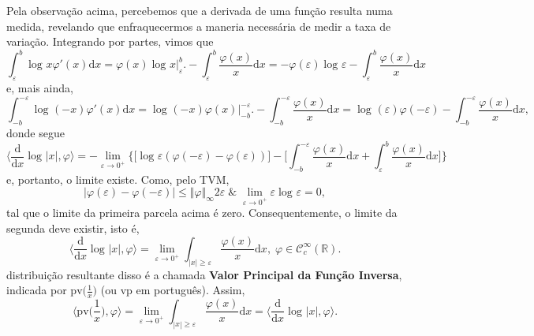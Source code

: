 \documentclass[../distribution_theory_notes.tex]{subfiles}
\begin{document}
               Pela observação acima, percebemos que a derivada de uma função resulta numa medida, revelando que enfraquecermos a maneria necessária de medir a taxa de variação. Integrando por partes, vimos que 
                 \[
                   \int_{\varepsilon }^{b}\log^{}{x}\varphi '(x) \mathrm{d}x = \varphi (x)\log^{}{x}\biggl|_{\varepsilon }^{b}\biggr. - \int_{\varepsilon }^{b}\frac{\varphi (x) }{x} \mathrm{d}x = -\varphi (\varepsilon )\log^{}{\varepsilon }- \int_{\varepsilon }^{b}\frac{\varphi (x)}{x} \mathrm{d}x
                 \]
                 e, mais ainda, 
                   \[
                     \int_{-b}^{-\varepsilon }\log^{}{(-x)}\varphi'(x) \mathrm{d}x = \log^{}{(-x)}\varphi (x)\biggl|_{-b}^{-\varepsilon }\biggr. - \int_{-b}^{-\varepsilon }\frac{\varphi (x)}{x} \mathrm{d}x = \log^{}{(\varepsilon )} \varphi (-\varepsilon )- \int_{-b}^{-\varepsilon }\frac{\varphi (x)}{x} \mathrm{d}x,
                   \]
                   donde segue 
                     \[
                       \biggl\langle \frac{\mathrm{d}}{\mathrm{d}x}\log^{}{| x |}, \varphi  \biggr\rangle = - \lim_{\varepsilon \to 0^{+}}\biggl\{\biggl[\log^{}{\varepsilon }(\varphi (-\varepsilon )-\varphi(\varepsilon ))\biggr]-\biggl[\int_{-b}^{-\varepsilon }\frac{\varphi(x)}{x} \mathrm{d}x + \int_{\varepsilon }^{b}\frac{\varphi (x)}{x} \mathrm{d}x\biggr]\biggr\}
                     \]
                     e, portanto, o limite existe. Como, pelo TVM, 
                       \[
                         | \varphi (\varepsilon )-\varphi (-\varepsilon ) | \leq \Vert \varphi  \Vert_{\infty} 2\varepsilon \;\&\; \lim_{\varepsilon \to 0^{+}} \varepsilon \log^{}{\varepsilon }=0,
                       \]
                       tal que o limite da primeira parcela acima é zero. Consequentemente, o limite da segunda deve existir, isto é, 
                         \[
                           \biggl\langle \frac{\mathrm{d}}{\mathrm{d}x} \log^{}{| x |}, \varphi  \biggr\rangle = \lim_{\varepsilon \to 0^{+}} \int_{| x |\geq \varepsilon }^{}\frac{\varphi (x)}{x} \mathrm{d}x,\; \varphi \in \mathcal{C}_{c}^{\infty}(\mathbb{R}).
                         \]
                          distribuição resultante disso é a chamada \textbf{Valor Principal da Função Inversa}, indicada por \(\mathrm{pv}\bigl(\frac{1}{x}\bigr)\) (ou \(\mathrm{vp}\) em português). Assim, 
                            \[
                              \biggl\langle \mathrm{pv}\bigl(\frac{1}{x}\bigr), \varphi  \biggr\rangle = \lim_{\varepsilon \to 0^{+}} \int_{| x |\geq \varepsilon }^{}\frac{\varphi (x)}{x} \mathrm{d}x = \biggl\langle \frac{\mathrm{d}}{\mathrm{d}x}\log^{}{|x|}, \varphi \biggr\rangle.
                            \]
\end{document}
